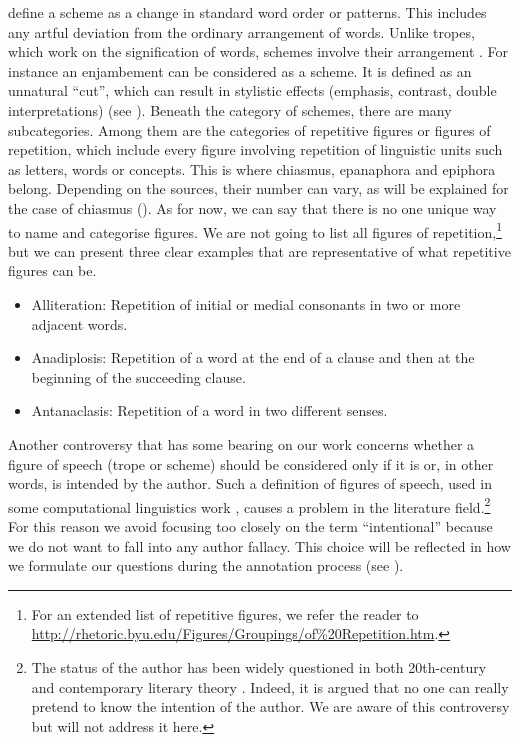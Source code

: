 \cite{greene2012} define a scheme as a change in standard word order or patterns. This includes any artful deviation from the ordinary arrangement of words. Unlike tropes, which work on the signification of words, schemes involve their arrangement \citep[Art. ``Scheme'']{greene2012}.  For instance an enjambement can be considered as a scheme. It is defined as an unnatural ``cut'', which can result in stylistic effects (emphasis, contrast, double interpretations) (see ).
%
Beneath the category of schemes, there are many subcategories. Among them are the categories of repetitive figures or figures of repetition, which include every figure involving repetition of linguistic units such as letters, words or concepts.
 This is where chiasmus, epanaphora and epiphora belong. Depending on the sources, their number can vary, as will be explained for the case of chiasmus (). As for now, we can say that there is no one unique way to name and categorise figures. We are not going to list all figures of repetition,\footnote{For an extended list of repetitive figures, we refer the reader to \url{http://rhetoric.byu.edu/Figures/Groupings/of\%20Repetition.htm}. } but we can present three clear examples that are representative of what repetitive figures can be.
 \begin{itemize}
  \item Alliteration: Repetition of initial or medial consonants in two or more adjacent words.
  \item Anadiplosis: Repetition of a word at the end of a clause and then at the beginning of the succeeding clause.
 \item Antanaclasis: Repetition of a word in two different senses.
 \end{itemize}
Another controversy that has some bearing on our work concerns whether a figure of speech (trope or scheme) should be considered only if it is  or, in other words, is intended by the author. Such a definition of figures of speech, used in some computational linguistics work \citep{Strommer2011}, causes a problem in the literature field.\footnote{The status of the author has been widely questioned in both 20th-century and contemporary literary theory \citep{Barthes1984}. Indeed, it is argued that no one can really pretend to know the intention of the author. We are aware of this controversy but will not address it here.} For this reason we avoid focusing too closely on the term ``intentional'' because we do not want to fall into any author fallacy. This choice will be reflected in how we formulate our questions during the annotation process (see ).  %

